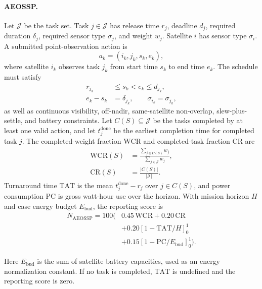 \documentclass[]{mosi}
\begin{document}
\paragraph{AEOSSP.} Let \(\mathcal{J}\) be the task set. Task \(j\in\mathcal{J}\) has release time \(r_j\), deadline \(d_j\), required duration \(\delta_j\), required sensor type \(\sigma_j\), and weight \(w_j\). Satellite \(i\) has sensor type \(\sigma_i\). A submitted point-observation action is
\[
  a_k=(i_k,j_k,s_k,e_k),
\]
where satellite \(i_k\) observes task \(j_k\) from start time \(s_k\) to end time \(e_k\). The schedule must satisfy
\[
  \begin{aligned}
  r_{j_k}&\le s_k<e_k\le d_{j_k},\\
  e_k-s_k&=\delta_{j_k},\qquad \sigma_{i_k}=\sigma_{j_k},
  \end{aligned}
\]
as well as continuous visibility, off-nadir, same-satellite non-overlap, slew-plus-settle, and battery constraints. Let \(C(S)\subseteq\mathcal{J}\) be the tasks completed by at least one valid action, and let \(t^{\mathrm{done}}_j\) be the earliest completion time for completed task \(j\). The completed-weight fraction \(\mathrm{WCR}\) and completed-task fraction \(\mathrm{CR}\) are
\[
  \begin{aligned}
  \mathrm{WCR}(S)&=\frac{\sum_{j\in C(S)}w_j}{\sum_{j\in\mathcal{J}} w_j},\\
  \mathrm{CR}(S)&=\frac{|C(S)|}{|\mathcal{J}|}.
  \end{aligned}
\]
Turnaround time \(\mathrm{TAT}\) is the mean \(t^{\mathrm{done}}_j-r_j\) over \(j\in C(S)\), and power consumption \(\mathrm{PC}\) is gross watt-hour use over the horizon. With mission horizon \(H\) and case energy budget \(E_{\mathrm{bud}}\), the reporting score is
\[
  \begin{aligned}
  N_{\mathrm{AEOSSP}}=100(&0.45\,\mathrm{WCR}+0.20\,\mathrm{CR}\\
  &+0.20[1-\mathrm{TAT}/H]_0^1\\
  &+0.15[1-\mathrm{PC}/E_{\mathrm{bud}}]_0^1).
  \end{aligned}
\]

Here \(E_{\mathrm{bud}}\) is the sum of satellite battery capacities, used as an energy normalization constant. If no task is completed, \(\mathrm{TAT}\) is undefined and the reporting score is zero.
\end{document}
